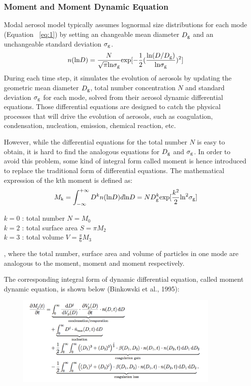 \documentclass[12pt]{article}
\begin{document}
	\subsubsection{Moment and Moment Dynamic Equation}
	Modal aerosol model typically assumes lognormal size distributions for each mode (Equation ~\ref{eq:1}) by setting an changeable mean diameter $D_{\rm g}$ and an unchangeable standard deviation $\sigma_{\rm g}$. 
	\begin{align}\label{eq:1}
	n(\text{ln}D) = \frac{N}{\sqrt{\pi}\text{ln}\sigma_{\rm g}}\text{exp}[-\frac{1}{2}(\frac{\text{ln}(D/D_{\rm g})}{\text{ln}\sigma_{\rm g}})^2]
	\end{align}
	During each time step, it simulates the evolution of aerosols by updating the geometric mean diameter $D_{\rm g}$, total number concentration $N$ and standard deviation $\sigma_{\rm g}$ for each mode, solved from their aerosol dynamic differential equations. Those differential equations are designed to catch the physical processes that will drive the evolution of aerosols, such as coagulation, condensation, nucleation, emission, chemical reaction, etc.
	
	 However, while the differential equations for the total number $N$ is easy to obtain, it is hard to find the analogous equations for $D_{\rm g}$ and $\sigma_{\rm g}$. In order to avoid this problem, some kind of integral form called moment is hence introduced to replace the traditional form of differential equations. The mathematical expression of the kth moment is defined as:
	 \begin{align}
	 M_\text{k} = \int_{-\infty}^{+\infty}D^kn(\text{ln}D)d\text{ln}D = ND_{\rm g}^k\text{exp}[\frac{k^2}{2}\text{ln}^2\sigma_{\rm g}]
	 \end{align}
	 \begin{flushleft}
	 	$k = 0$ : total number $N = M_0$ \\
	 	$k = 2$ : total surface area $S = \pi M_2$ \\
	 	$k = 3$ : total volume $V = \frac{\pi}{6}M_3$ \\
	 \end{flushleft}
	, where the total number, surface area and volume of particles in one mode are analogous to the  moment,  moment and  moment respectively. 
	
	The corresponding integral form of dynamic differential equation, called moment dynamic equation, is shown below (Binkowski et al., 1995):
	\begin{figure}[!h]
		\begin{center}
			\includegraphics[width = 0.9\textwidth]{Figure05}
		\end{center}
	\end{figure}
	
\end{document}
